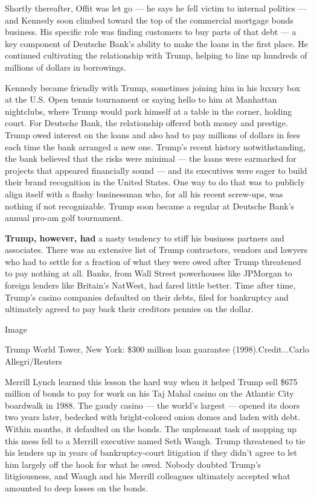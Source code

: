 Shortly thereafter, Offit was let go --- he says he fell victim to
internal politics --- and Kennedy soon climbed toward the top of the
commercial mortgage bonds business. His specific role was finding
customers to buy parts of that debt --- a key component of Deutsche
Bank's ability to make the loans in the first place. He continued
cultivating the relationship with Trump, helping to line up hundreds of
millions of dollars in borrowings.

Kennedy became friendly with Trump, sometimes joining him in his luxury
box at the U.S. Open tennis tournament or saying hello to him at
Manhattan nightclubs, where Trump would park himself at a table in the
corner, holding court. For ­Deutsche Bank, the relationship offered both
money and prestige. Trump owed interest on the loans and also had to pay
millions of dollars in fees each time the bank arranged a new one.
Trump's recent history notwithstanding, the bank believed that the risks
were minimal --- the loans were earmarked for projects that appeared
financially sound --- and its executives were eager to build their brand
recognition in the United States. One way to do that was to publicly
align itself with a flashy businessman who, for all his recent
screw-ups, was nothing if not recognizable. Trump soon became a regular
at ­Deutsche Bank's annual pro-am golf tournament.

\textbf{Trump, however, had} a nasty tendency to stiff his business
partners and associates. There was an extensive list of Trump
contractors, vendors and lawyers who had to settle for a fraction of
what they were owed after Trump threatened to pay nothing at all. Banks,
from Wall Street powerhouses like JPMorgan to foreign lenders like
Britain's NatWest, had fared little better. Time after time, Trump's
casino companies defaulted on their debts, filed for bankruptcy and
ultimately agreed to pay back their creditors pennies on the dollar.

Image

Trump World Tower, New York: \$300 million loan guarantee
(1998).Credit...Carlo Allegri/Reuters

Merrill Lynch learned this lesson the hard way when it helped Trump sell
\$675 million of bonds to pay for work on his Taj Mahal casino on the
Atlantic City boardwalk in 1988. The gaudy casino --- the world's
largest --- opened its doors two years later, bedecked with
bright-­colored onion domes and laden with debt. Within months, it
defaulted on the bonds. The unpleasant task of mopping up this mess fell
to a Merrill executive named Seth Waugh. Trump threatened to tie his
lenders up in years of bankruptcy-­court litigation if they didn't agree
to let him largely off the hook for what he owed. Nobody doubted Trump's
litigiousness, and Waugh and his Merrill colleagues ultimately accepted
what amounted to deep losses on the bonds.


